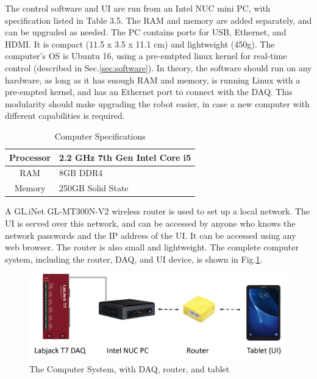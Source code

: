 \documentclass[12pt]{report}
\begin{document}
	The control software and UI are run from an Intel NUC mini PC, with specification listed in Table 3.5. The RAM and memory are added separately, and can be upgraded as needed. The PC contains ports for USB, Ethernet, and HDMI. It is compact (11.5 x 3.5 x 11.1 cm) and lightweight (450g). The computer's OS is Ubuntu 16, using a pre-emtpted linux kernel for real-time control (described in Sec.\ref{sec:software}). In theory, the software should run on any hardware, as long as it has enough RAM and memory, is running Linux with a pre-empted kernel, and has an Ethernet port to connect with the DAQ. This modularity should make upgrading the robot easier, in case a new computer with different capabilities is required. 
	
	
	\begin{table}[h]
	\centering
	\caption{Computer Specifications}	
	\begin{tabular}{|c|l|}
		\hline
		Processor & 2.2 GHz 7th Gen Intel Core i5 \\ \hline
		RAM & 8GB DDR4 \\ \hline
		Memory & 250GB Solid State \\ \hline
		\end{tabular}
	\label{tab:comp}
	\end{table}
	
	 
	A GL.iNet GL-MT300N-V2 wireless router is used to set up a local network. The UI is served over this network, and can be accessed by anyone who knows the network passwords and the IP address of the UI. It can be accessed using any web browser. The router is also small and lightweight. The complete computer system, including the router, DAQ, and UI device, is shown in Fig.\ref{fig:comp}. 
	


	\begin{figure}[h] 
		\centering
		\includegraphics[width=\linewidth]{computer_system}
		\caption{The Computer System, with DAQ, router, and tablet}
		\label{fig:comp}
	\end{figure}
	
	
		
\end{document}
